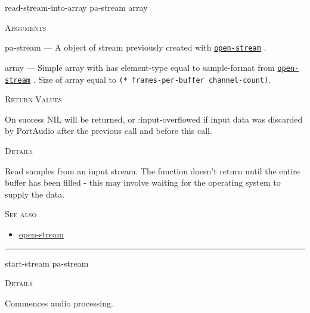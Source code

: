 \documentclass[a4paper]{report}
\begin{document}
    \label{portaudio__fun__read-stream-into-array}
    \begin{defun}[Function]
    read-stream-into-array pa-stream array


    
    \bigskip
    \textsc{Arguments}

pa-stream
	--- A object of stream previously created with \hyperref[portaudio__fun__open-stream]{\texttt{open-stream}}
  .

array
	--- Simple array with has element-type equal to sample-format from \hyperref[portaudio__fun__open-stream]{\texttt{open-stream}}
  . Size of array equal to \texttt{(* frames-per-buffer channel-count)}.




    
    \bigskip
    \textsc{Return Values}


On success NIL will be returned, or :input-overflowed if input data was discarded by PortAudio after the previous call and before this call. 


	
    \bigskip
    \textsc{Details}

Read samples from an input stream. The function doesn't return until the entire buffer has been filled - this may involve waiting for the operating system to supply the data. 






      
    \bigskip
    \textsc{See also}


	
    \begin{itemize}
    
	  
    \item
    \hyperref[portaudio__fun__open-stream]{open-stream}
    
	
    \end{itemize}
  
      


    
    \end{defun}
  
  

    \rule{\linewidth}{0.1mm}
    
    \label{portaudio__fun__start-stream}
    \begin{defun}[Function]
    start-stream pa-stream


	
    \bigskip
    \textsc{Details}

Commences audio processing.


    
    \end{defun}
  
\end{document}
